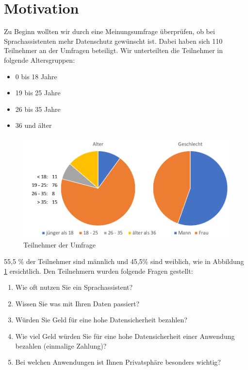 \section{Motivation}\label{sec:motivaiton}

Zu Beginn wollten wir durch eine Meinungsumfrage überprüfen, ob bei Sprachassistenten mehr Datenschutz gewünscht ist. Dabei haben sich 110 Teilnehmer an der Umfragen beteiligt. Wir unterteilten die Teilnehmer in folgende Altersgruppen:

\begin{itemize}
	\item 0 bis 18 Jahre 
	\item 19 bis 25 Jahre
	\item 26 bis 35 Jahre
	\item 36 und älter	
\end{itemize}

\begin{figure}[h!]
	\centering
	\includegraphics[width=0.7\linewidth]{Picture/umfrage_teilnehmer}
	\caption[Teilnehmer der Umfrage]{Teilnehmer der Umfrage}
	\label{fig:umfrage_teilnehmer}
\end{figure}

55,5 \% der Teilnehmer sind männlich und 45,5\% sind weiblich, wie in Abbildung \ref{fig:umfrage_teilnehmer} ersichtlich. Den Teilnehmern wurden folgende Fragen gestellt:

\begin{enumerate}
	
	\item Wie oft nutzen Sie ein Sprachassistent?
	\item Wissen Sie was mit Ihren Daten passiert?
	\item Würden Sie Geld für eine hohe Datensicherheit bezahlen?
	\item Wie viel Geld würden Sie für eine hohe Datensicherheit einer Anwendung bezahlen (einmalige Zahlung)?
	\item Bei welchen Anwendungen ist Ihnen Privatsphäre besonders wichtig?
	
\end{enumerate}

